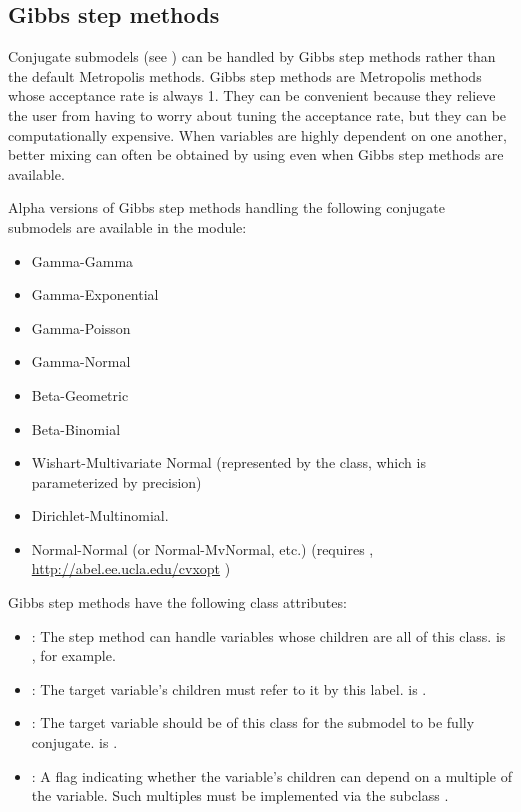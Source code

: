 \hypertarget{gibbs}{}
\subsection*{Gibbs step methods} \label{gibbs}

Conjugate submodels (see \cite{gelman}) can be handled by Gibbs step methods rather than the default Metropolis methods. Gibbs step methods are Metropolis methods whose acceptance rate is always 1. They can be convenient because they relieve the user from having to worry about tuning the acceptance rate, but they can be computationally expensive. When variables are highly dependent on one another, better mixing can often be obtained by using  even when Gibbs step methods are available.

Alpha versions of Gibbs step methods handling the following conjugate submodels are available in the  module:
\begin{itemize}
    \item Gamma-Gamma
    \item Gamma-Exponential
    \item Gamma-Poisson
    \item Gamma-Normal
    \item Beta-Geometric
    \item Beta-Binomial
    \item Wishart-Multivariate Normal (represented by the  class, which is parameterized by precision)
    \item Dirichlet-Multinomial.
    \item Normal-Normal (or Normal-MvNormal, etc.) (requires , \href{http://abel.ee.ucla.edu/cvxopt}{http://abel.ee.ucla.edu/cvxopt} )
\end{itemize}

Gibbs step methods have the following class attributes:
\begin{itemize}
    \item {}: The step method can handle variables whose children are all of this class.  is , for example.
    \item {}: The target variable's children must refer to it by this label.  is .
    \item {}: The target variable should be of this class for the submodel to be fully conjugate.  is .
    \item {}: A flag indicating whether the variable's children can depend on a multiple of the variable. Such multiples must be implemented via the  subclass .
\end{itemize}

